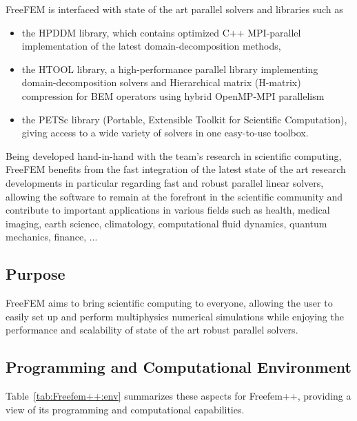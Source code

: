 FreeFEM is interfaced with state of the art parallel solvers and libraries such as

\begin{itemize}
\item the HPDDM library, which contains optimized C++ MPI-parallel implementation of the latest domain-decomposition methods,
\item the HTOOL library, a high-performance parallel library implementing domain-decomposition solvers and Hierarchical matrix (H-matrix)
compression for BEM operators using hybrid OpenMP-MPI parallelism
\item the PETSc library (Portable, Extensible Toolkit for Scientific Computation), giving access to a wide variety of solvers in one easy-to-use toolbox. 
\end{itemize}

Being developed hand-in-hand with the team's research in scientific computing, FreeFEM benefits from the fast integration of the latest state of the art research developments in particular regarding fast and robust parallel linear solvers, allowing the software to remain at the forefront in the scientific community and contribute to important applications in various fields such as health, medical imaging, earth science, climatology, computational fluid dynamics, quantum mechanics, finance, ...

\subsection{Purpose}
\label{sec:Freefem++:purpose}

FreeFEM aims to bring scientific computing to everyone, allowing the user to easily set up and perform multiphysics numerical simulations while enjoying the performance and scalability of state of the art robust parallel solvers.

\subsection{Programming and Computational Environment}
\label{sec::Freefem++:environment_capabilities}


Table~\ref{tab:Freefem++:env} summarizes these aspects for Freefem++, providing a  view of its programming and computational capabilities.

